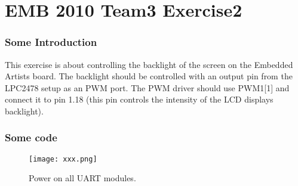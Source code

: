 

\part*{EMB 2010 Team3 Exercise2}
\section{Some Introduction}
This exercise is about controlling the backlight of the screen on the Embedded Artists board. 
The backlight should be controlled with an output pin from the LPC2478 setup as an PWM port.
The PWM driver should use PWM1[1] and connect it to pin 1.18 (this pin controls the intensity of the LCD displays backlight).
\section{Some code}



\begin{figure}[h!]		%
 \begin{centering}
  \texttt{[image: xxx.png]}
   \caption{Power on all UART modules.}
 \end{centering}
\end{figure}


